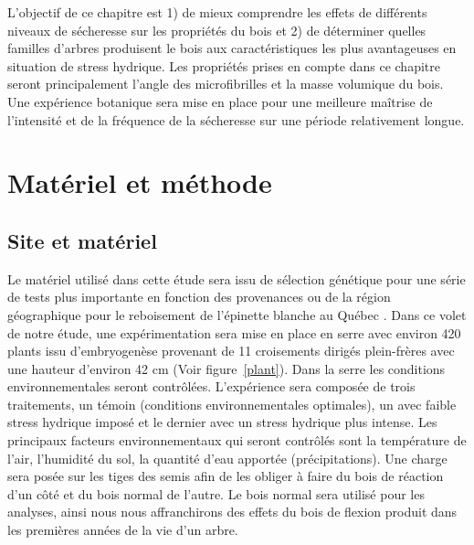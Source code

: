 \documentclass{report}
\begin{document}
L'objectif de ce chapitre est 1) de mieux comprendre les effets de différents niveaux de sécheresse sur les propriétés du bois et 2) de déterminer quelles familles d'arbres produisent le bois aux caractéristiques les plus avantageuses en situation de stress hydrique. Les propriétés prises en compte dans ce chapitre seront principalement l'angle des microfibrilles et la masse volumique du bois. Une expérience botanique sera mise en place pour une meilleure maîtrise de l'intensité et de la fréquence de la sécheresse sur une période relativement longue.   


\section*{Matériel et méthode}

\subsection*{Site et matériel}

Le matériel utilisé dans cette étude sera issu de sélection génétique pour une série de tests plus importante en fonction des provenances ou de la région géographique pour le reboisement de l'épinette blanche au Québec \citep{Beaulieu1996}. Dans ce volet de notre étude, une expérimentation sera mise en place en serre avec environ 420 plants issu d'embryogenèse provenant de 11 croisements dirigés plein-frères avec une hauteur d'environ 42 cm (Voir figure~\ref{plant}). Dans la serre les conditions environnementales seront contrôlées. L'expérience sera composée de trois traitements, un témoin (conditions environnementales optimales),
un avec faible stress hydrique imposé et le dernier avec un stress hydrique plus intense. Les principaux facteurs environnementaux qui seront contrôlés sont la température de l'air, l'humidité du sol, la quantité d'eau apportée (précipitations). Une charge sera posée sur les tiges des semis afin de les obliger à faire du bois de réaction d'un côté et du bois normal de l'autre. 
Le bois normal sera utilisé pour les analyses, ainsi nous nous affranchirons des effets du bois de flexion produit dans les premières années de la vie d'un arbre. %
\end{document}
